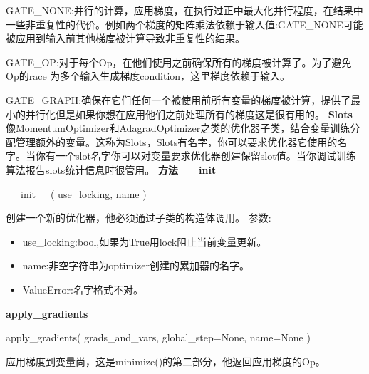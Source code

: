 GATE\_NONE:并行的计算，应用梯度，在执行过正中最大化并行程度，在结果中一些非重复性的代价。例如两个梯度的矩阵乘法依赖于输入值:GATE\_NONE可能被应用到输入前其他梯度被计算导致非重复性的结果。

GATE\_OP:对于每个Op，在他们使用之前确保所有的梯度被计算了。为了避免Op的race 为多个输入生成梯度condition，这里梯度依赖于输入。

GATE\_GRAPH:确保在它们任何一个被使用前所有变量的梯度被计算，提供了最小的并行化但是如果你想在应用他们之前处理所有的梯度这是很有用的。
\textbf{Slots}\newline
像MomentumOptimizer和AdagradOptimizer之类的优化器子类，结合变量训练分配管理额外的变量。这称为Slots，Slots有名字，你可以要求优化器它使用的名字。当你有一个slot名字你可以对变量要求优化器创建保留slot值。当你调试训练算法报告slots统计信息时很管用。
\textbf{方法}\newline
\textbf{\_\_init\_\_}
\begin{python}
__init__(
    use_locking,
    name
)
\end{python}
创建一个新的优化器，他必须通过子类的构造体调用。\newline
参数:
\begin{itemize}
	\item use\_locking:bool,如果为True用lock阻止当前变量更新。
	\item name:非空字符串为optimizer创建的累加器的名字。
	\item ValueError:名字格式不对。
\end{itemize}
\textbf{apply\_gradients}
\begin{python}
apply_gradients(
    grads_and_vars,
    global_step=None,
    name=None
)
\end{python}
应用梯度到变量尚，这是minimize()的第二部分，他返回应用梯度的Op。

